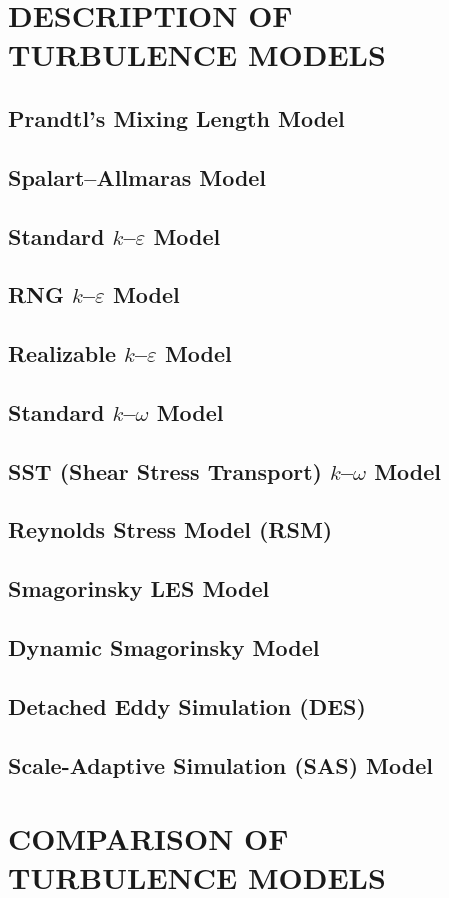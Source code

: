\documentclass[12pt, letterpaper]{article}
\begin{document}
\section{DESCRIPTION OF TURBULENCE MODELS}
\subsection{Prandtl's Mixing Length Model}
\subsection{Spalart--Allmaras Model}
\subsection{Standard $k$--$\varepsilon$ Model}
\subsection{RNG $k$--$\varepsilon$ Model}
\subsection{Realizable $k$--$\varepsilon$ Model}
\subsection{Standard $k$--$\omega$ Model}
\subsection{SST (Shear Stress Transport) $k$--$\omega$ Model}
\subsection{Reynolds Stress Model (RSM)}
\subsection{Smagorinsky LES Model}
\subsection{Dynamic Smagorinsky Model}
\subsection{Detached Eddy Simulation (DES)}
\subsection{Scale-Adaptive Simulation (SAS) Model}

\section{COMPARISON OF TURBULENCE MODELS}
\end{document}
